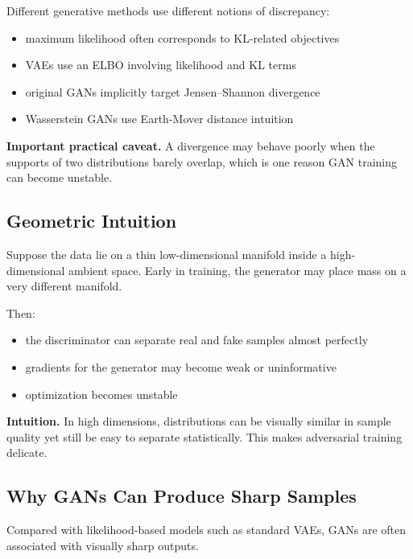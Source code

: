 \medskip

\noindent
Different generative methods use different notions of discrepancy:
\begin{itemize}
    \item maximum likelihood often corresponds to KL-related objectives
    \item VAEs use an ELBO involving likelihood and KL terms
    \item original GANs implicitly target Jensen--Shannon divergence
    \item Wasserstein GANs use Earth-Mover distance intuition
\end{itemize}

\medskip

\noindent
\textbf{Important practical caveat.}
A divergence may behave poorly when the supports of two distributions barely overlap, which is one reason GAN training can become unstable.

\subsection{Geometric Intuition}

Suppose the data lie on a thin low-dimensional manifold inside a high-dimensional ambient space. Early in training, the generator may place mass on a very different manifold.

\medskip

\noindent
Then:
\begin{itemize}
    \item the discriminator can separate real and fake samples almost perfectly
    \item gradients for the generator may become weak or uninformative
    \item optimization becomes unstable
\end{itemize}

\medskip

\noindent
\textbf{Intuition.}
In high dimensions, distributions can be visually similar in sample quality yet still be easy to separate statistically. This makes adversarial training delicate.

\subsection{Why GANs Can Produce Sharp Samples}

Compared with likelihood-based models such as standard VAEs, GANs are often associated with visually sharp outputs.

